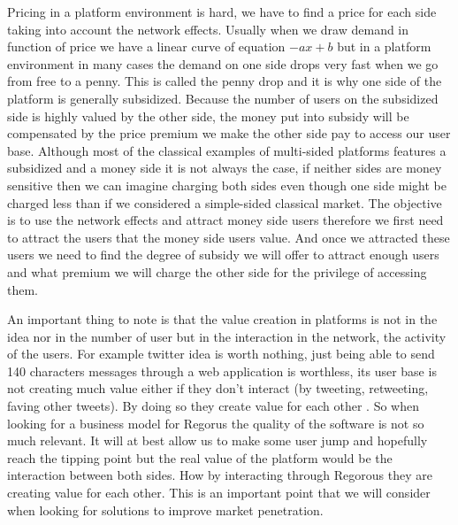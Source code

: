 \documentclass[10pt]{report}
\begin{document}
Pricing in a platform environment is hard, we have to find a price for each side taking into account the network effects. Usually when we draw demand in function of price we have a linear curve of equation $-ax + b$ but in a platform environment in many cases the demand on one side drops very fast when we go from free to a penny. This is called the penny drop and it is why one side of the platform is generally subsidized. Because the number of users on the subsidized side is highly valued by the other side, the money put into subsidy will be compensated by the price premium we make the other side pay to access our user base. Although most of the classical examples of multi-sided platforms features a subsidized and a money side it is not always the case, if neither sides are money sensitive then we can imagine charging both sides even though one side might be charged less than if we considered a simple-sided classical market.
The objective is to use the network effects and attract money side users therefore we first need to attract the users that the money side users value. And once we attracted these users we need to find the degree of subsidy we will offer to attract enough users and what premium we will charge the other side for the privilege of accessing them. \autocite{rochet2003platform}

An important thing to note is that the value creation in platforms is not in the idea nor in the number of user but in the interaction in the network, the activity of the users. For example twitter idea is worth nothing, just being able to send 140 characters messages through a web application is worthless, its user base is not creating much value either if they don't interact (by tweeting, retweeting, faving other tweets). By doing so they create value for each other \autocite{Choudary2014}. So when looking for a business model for Regorus the quality of the software is not so much relevant. It will at best allow us to make some user jump and hopefully reach the tipping point but the real value of the platform would be the interaction between both sides. How by interacting through Regorous they are creating value for each other. This is an important point that we will consider when looking for solutions to improve market penetration. \autocite{economides2006}
\end{document}
